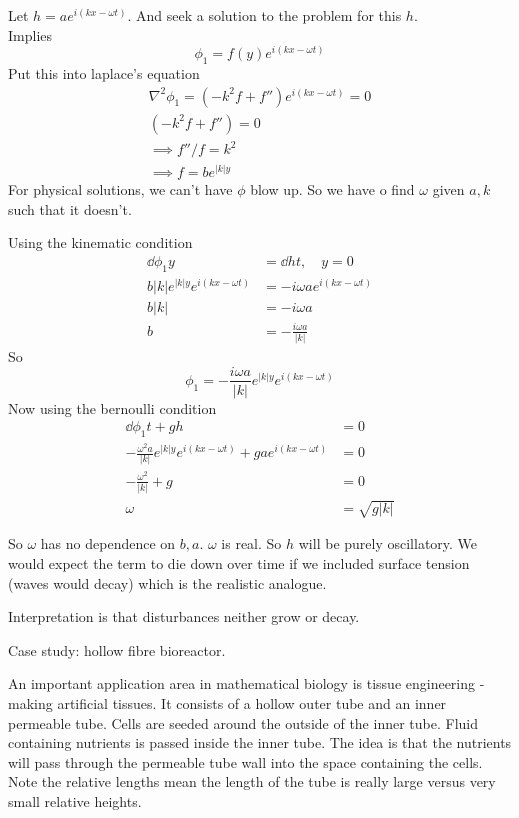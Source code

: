 \documentclass{/home/janmebows/Documents/LatexTemplates/myassignment}
\begin{document}
Let $h = ae^{i(kx - \omega t)}$. And seek a solution to the problem for this $h$.\\
Implies
\[\phi_1 = f(y)e^{i(kx - \omega t)} \]
Put this into laplace's equation
\begin{align*}
    \nabla^2 \phi_1 = (-k^2f + f'')e^{i(kx - \omega t)} =0\\
    (-k^2f + f'') = 0\\
    \implies f''/f = k^2\\
    \implies f = be^{|k|y}
\end{align*}
For physical solutions, we can't have $\phi$ blow up.
So we have o find $\omega$ given $a,k$ such that it doesn't.

Using the kinematic condition
\begin{align*}
    \dd{\phi_1}y &= \dd ht, \quad y=0\\
    b |k| e^{|k|y} e^{i(kx-\omega t)} &= -i\omega a e^{i(kx - \omega t)}\\
    b|k| & = -i\omega a\\
    b &= -\frac{i\omega a}{|k|}
\end{align*}
So 
\[\phi_1 = -\frac{i\omega a}{|k|} e^{|k|y} e^{i(kx-\omega t)} \]
Now using the bernoulli condition
\begin{align*}
    \dd{\phi_1}{t} + gh &= 0\\
    -\frac{\omega^2 a}{|k|} e^{|k|y} e^{i(kx-\omega t)} + gae^{i(kx-\omega t)}&=0\\
    -\frac{\omega^2}{|k|} + g&=0\\
    \omega &= \sqrt{g|k|}
\end{align*}

So $\omega$ has no dependence on $b,a$. $\omega$ is real. So $h$ will be purely oscillatory.
We would expect the term to die down over time if we included surface tension (waves would decay) which is the realistic analogue.

Interpretation is that disturbances neither grow or decay.



Case study: hollow fibre bioreactor.

An important application area in mathematical biology is tissue engineering - making artificial tissues. It consists of a hollow outer tube and an inner permeable tube. Cells are seeded around the outside of the inner tube. Fluid containing nutrients is passed inside the inner tube. The idea is that the nutrients will pass through the permeable tube wall into the space containing the cells.
Note the relative lengths mean the length of the tube is really large versus very small relative heights. 
\end{document}
